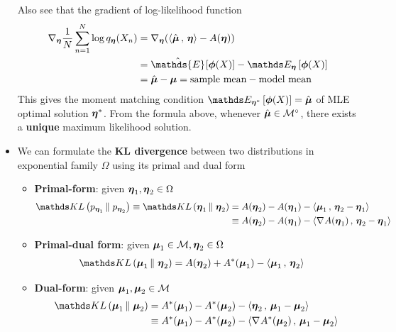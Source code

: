 \documentclass[11pt]{article}
\begin{document}
\begin{itemize}
Also see that the gradient of log-likelihood function 
\begin{align}
\grad{\mb{\eta}}{\frac{1}{N}\sum_{n=1}^{N}\log q_{\mb{\eta}}(X_{n}) }&= \grad{\mb{\eta}}{\paren{\inn{\hat{\mb{\mu}}}{\mb{\eta}} - A(\mb{\eta}) }} \nonumber\\
&=  \hat{\mathds{E}}_{}[\mb{\phi}(X)] - \E{\mb{\eta}}{\mb{\phi}(X)} \label{eqn: grad_log_likelihood}\\
&=  \hat{\mb{\mu}} - \mb{\mu}  = \text{sample mean} - \text{model mean}  \nonumber
\end{align} This gives the moment matching condition $\E{\mb{\eta}^{*}}{\mb{\phi}(X)} = \hat{\mb{\mu}}$ of MLE optimal solution $\boldsymbol{\eta}^{*}$.
From the formula above, whenever $\hat{\boldsymbol{\mu}} \in {\mathcal M}^{\circ}$, there exists a \textbf{unique} maximum likelihood solution.



\item We can formulate the \textbf{KL divergence} between two distributions in exponential family $\Omega$ using its primal and dual form
\begin{itemize}
\item \textbf{Primal-form}: given $\boldsymbol{\eta}_1, \boldsymbol{\eta}_2 \in \Omega$
\begin{align}
\kl{p_{\mb{\eta}_1}}{p_{\mb{\eta}_2}} \equiv  \kl{\mb{\eta}_1}{\mb{\eta}_2}
&=  A(\mb{\eta}_2) - A(\mb{\eta}_1) -  \inn{\mb{\mu}_{1}}{\mb{\eta}_2 - \mb{\eta}_1}  \label{eqn: kl_primal}\\
&\equiv  A(\mb{\eta}_2) - A(\mb{\eta}_1) -  \inn{\grad{}{A}(\mb{\eta}_1)}{\mb{\eta}_2 - \mb{\eta}_1}  \nonumber
\end{align}

\item \textbf{Primal-dual form}: given $\boldsymbol{\mu}_1 \in {\mathcal M}, \boldsymbol{\eta}_2 \in \Omega$
\begin{align}
 \kl{\mb{\mu}_1}{\mb{\eta}_2} &= A(\mb{\eta}_2) + A^{*}(\mb{\mu}_1) - \inn{\mb{\mu}_{1}}{\mb{\eta}_2}  \label{eqn: kl_primal_dual}
\end{align}

\item \textbf{Dual-form}: given $\boldsymbol{\mu}_1, \boldsymbol{\mu}_2  \in {\mathcal M}$
\begin{align}
 \kl{\mb{\mu}_1}{\mb{\mu}_2} &= A^{*}(\mb{\mu}_1) - A^{*}(\mb{\mu}_{2}) - \inn{\mb{\eta}_2}{\mb{\mu}_{1} - \mb{\mu}_{2}}  \label{eqn: kl_dual} \\
 &\equiv  A^{*}(\mb{\mu}_1) - A^{*}(\mb{\mu}_{2}) - \inn{\grad{}{A^{*}}(\mb{\mu}_{2})}{\mb{\mu}_{1} - \mb{\mu}_{2}} \nonumber
\end{align}
\end{itemize}
\end{itemize}
\end{document}
